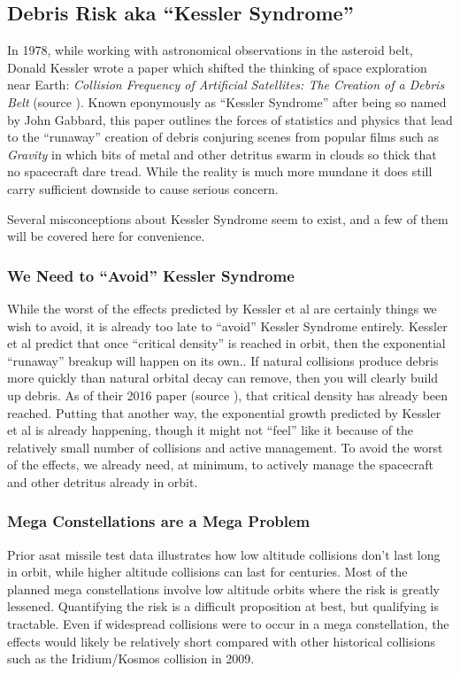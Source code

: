 \subsection{Debris Risk aka ``Kessler Syndrome''}

In 1978, while working with astronomical observations in the asteroid
belt, Donald Kessler wrote a paper which shifted the thinking of space
exploration near Earth: {\it Collision Frequency of Artificial
  Satellites: The Creation of a Debris Belt} (source
\cite{kessler-og}). Known eponymously as ``Kessler Syndrome'' after
being so named by John Gabbard, this paper outlines the forces of
statistics and physics that lead to the ``runaway'' creation of debris
conjuring scenes from popular films such as {\it Gravity} in which
bits of metal and other detritus swarm in clouds so thick that no
spacecraft dare tread.  While the reality is much more mundane it does
still carry sufficient downside to cause serious concern.

Several misconceptions about Kessler Syndrome seem to exist, and a few
of them will be covered here for convenience.

\subsubsection{We Need to ``Avoid'' Kessler Syndrome}
While the worst of the effects predicted by Kessler et al are
certainly things we wish to avoid, it is already too late to ``avoid''
Kessler Syndrome entirely.  Kessler et al predict that once ``critical
density'' is reached in orbit, then the exponential ``runaway''
breakup will happen on its own.\cite[p14]{kessler-reunion}.  If
natural collisions produce debris more quickly than natural orbital
decay can remove, then you will clearly build up debris.  As of their
2016 paper (source \cite{kessler-reunion}), that critical density has
already been reached.\cite[p10]{kessler-reunion} Putting that another
way, the exponential growth predicted by Kessler et al is already
happening, though it might not ``feel'' like it because of the
relatively small number of collisions and active
management.\cite[p14]{kessler-reunion} To avoid the worst of the
effects, we already need, at minimum, to actively manage the
spacecraft and other detritus already in
orbit.\cite[p14]{kessler-reunion}

\subsubsection{Mega Constellations are a Mega Problem}
Prior \ac{asat} missile test data illustrates how low altitude
collisions don't last long in orbit\cite{hello-decay}, while higher
altitude collisions can last for centuries.\cite{hello-decay} Most of
the planned mega constellations involve low altitude orbits where the
risk is greatly lessened.  Quantifying the risk is a difficult
proposition at best, but qualifying is tractable.  Even if widespread
collisions were to occur in a mega constellation, the effects would
likely be relatively short compared with other historical collisions
such as the Iridium/Kosmos collision in 2009.\cite{osa-debris}

